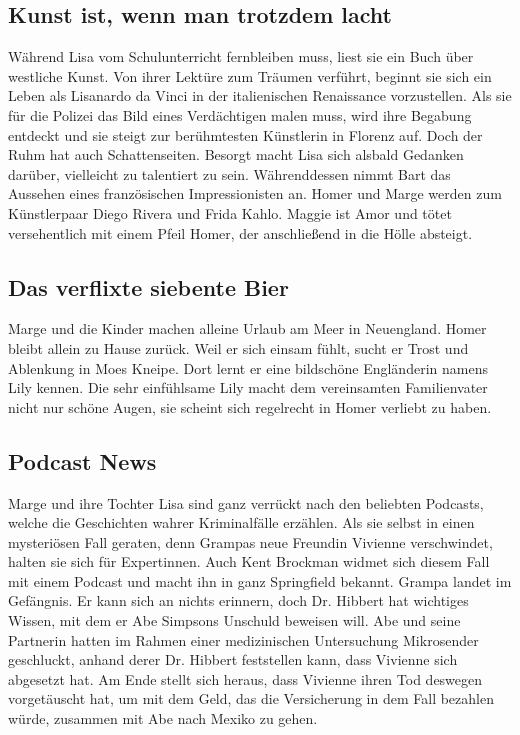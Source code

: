 \subsection{Kunst ist, wenn man trotzdem lacht}
Während Lisa vom Schulunterricht fernbleiben muss, liest sie ein Buch über westliche Kunst. Von ihrer Lektüre zum Träumen verführt, beginnt sie sich ein Leben als Lisanardo da Vinci in der italienischen Renaissance vorzustellen. Als sie für die Polizei das Bild eines Verdächtigen malen muss, wird ihre Begabung entdeckt und sie steigt zur berühmtesten Künstlerin in Florenz auf. Doch der Ruhm hat auch Schattenseiten. Besorgt macht Lisa sich alsbald Gedanken darüber, vielleicht zu talentiert zu sein. Währenddessen nimmt Bart das Aussehen eines französischen Impressionisten an. Homer und Marge werden zum Künstlerpaar Diego Rivera und Frida Kahlo. Maggie ist Amor und tötet versehentlich mit einem Pfeil Homer, der anschließend in die Hölle absteigt.


\subsection{Das verflixte siebente Bier}
Marge und die Kinder machen alleine Urlaub am Meer in Neuengland. Homer bleibt allein zu Hause zurück. Weil er sich einsam fühlt, sucht er Trost und Ablenkung in Moes Kneipe. Dort lernt er eine bildschöne Engländerin namens Lily kennen. Die sehr einfühlsame Lily macht dem vereinsamten Familienvater nicht nur schöne Augen, sie scheint sich regelrecht in Homer verliebt zu haben.


\subsection{Podcast News}
Marge und ihre Tochter Lisa sind ganz verrückt nach den beliebten Podcasts, welche die Geschichten wahrer Kriminalfälle erzählen. Als sie selbst in einen mysteriösen Fall geraten, denn Grampas neue Freundin Vivienne verschwindet, halten sie sich für Expertinnen. Auch Kent Brockman widmet sich diesem Fall mit einem Podcast und macht ihn in ganz Springfield bekannt. Grampa landet im Gefängnis. Er kann sich an nichts erinnern, doch Dr. Hibbert hat wichtiges Wissen, mit dem er Abe Simpsons Unschuld beweisen will. Abe und seine Partnerin hatten im Rahmen einer medizinischen Untersuchung Mikrosender geschluckt, anhand derer Dr. Hibbert feststellen kann, dass Vivienne sich abgesetzt hat. Am Ende stellt sich heraus, dass Vivienne ihren Tod deswegen vorgetäuscht hat, um mit dem Geld, das die Versicherung in dem Fall bezahlen würde, zusammen mit Abe nach Mexiko zu gehen.

